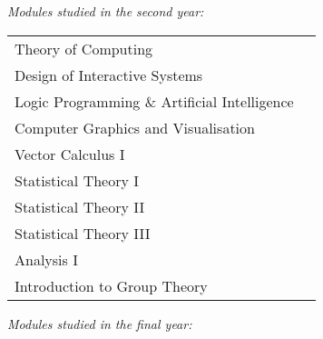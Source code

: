 \documentclass[10pt,a4paper]{article}
\begin{document}
\begin{small}
\begin{minipage}[t]{0.5\textwidth}

\textit{Modules studied in the second year:}

\begin{tabular}{ p{6cm} p{1cm} }
  Theory of Computing                          \\ %
  Design of Interactive Systems                \\ %
  Logic Programming \& Artificial Intelligence \\ %
  Computer Graphics and Visualisation          \\ %
  Vector Calculus I                            \\ %
  Statistical Theory I                         \\ %
  Statistical Theory II                        \\ %
  Statistical Theory III                       \\ %
  Analysis I                                   \\ %
  Introduction to Group Theory                 \\ %
\end{tabular}

\end{minipage}
\begin{minipage}[t]{0.5\textwidth}

\textit{Modules studied in the final year:}


\end{minipage}
\end{small}
\end{document}
